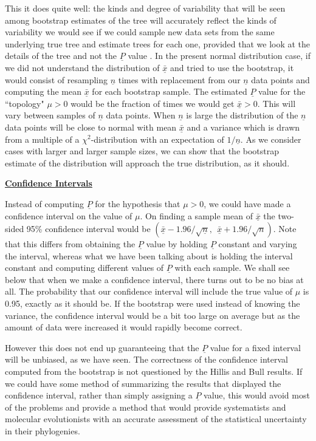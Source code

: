 {This it does quite well: the kinds and degree of variability that will be
seen among bootstrap estimates of the tree will accurately reflect the kinds
of variability we would see if we could sample new data sets from the
same underlying true tree and estimate trees for each one, provided
that we look at the details of the tree and not the $\underline{P}$ value .  In the
present normal distribution case, if we did not understand the distribution
of $\underline{\bar x}$ and tried to use the bootstrap, it would consist of resampling
$\underline{n}$ times with replacement from our $\underline{n}$ data points and computing the
mean $\underline{\bar x}$ for each bootstrap sample.  The estimated $\underline{P}$ value for
the ``topology" $\mu > 0$ would be the fraction of times we would get
$\underline{\bar x} > 0$.  This will vary between samples of $\underline{n}$ data points.  When
$\underline{n}$ is large the distribution of the $\underline{n}$ data points will be close to
normal with mean $\underline{\bar x}$ and a variance which is drawn from a multiple
of a $\chi^2$-distribution with an expectation of $1/\underline{n}$.  As we consider
cases with larger and larger sample sizes, we can show that the bootstrap
estimate of the distribution will approach the true distribution, as it
should.
\bigskip

\centerline{\underline{\bf Confidence Intervals}}
\bigskip

 Instead of computing $\underline{P}$ for the hypothesis that
 $\mu > 0$,
we could have made a confidence interval on the value of $\mu$.  On finding a
sample mean of $\underline{\bar x}$ the two-sided 95\% confidence interval would be
$(\underline{\bar x} - 1.96 /\sqrt{\underline{n}},~~ \underline{\bar x} + 1.96 / \sqrt{n})$.  Note that this
differs from obtaining the $\underline{P}$ value by holding $\underline{P}$ constant and varying the
interval, whereas what we have been talking about is holding the interval
constant and computing different values of $\underline{P}$ with each sample.  We shall
see below that when we
make a confidence interval, there turns out to be no bias at all.  The
probability that our confidence interval will include the true value of $\mu$
is 0.95, exactly as it should be.  If the bootstrap were used instead of
knowing the variance, the confidence interval would be a bit too large on
average but as the amount of data were increased it would rapidly become
correct.

However this does not end up guaranteeing that the $\underline{P}$ value for a
fixed interval will be unbiased, as we have seen.  The correctness of the
confidence interval computed from the bootstrap is not questioned by the Hillis
and Bull results.  If we could have some method of summarizing the results
that displayed the confidence interval, rather than simply assigning a $\underline{P}$
value, this would avoid most of the problems and provide a method that
would provide systematists and molecular evolutionists with an accurate
assessment of the statistical uncertainty in their phylogenies.
\bigskip

}
